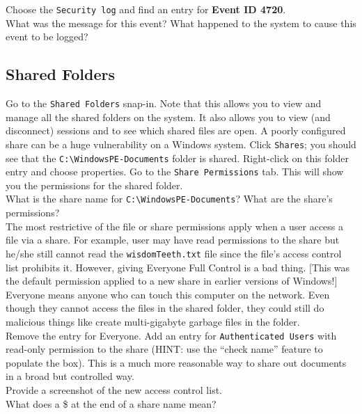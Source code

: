 \documentclass{article}
\begin{document}
\noindent Choose the {\tt Security log} and find an entry for \textbf{Event ID 4720}. \\

\question What was the message for this event? What happened to the system to cause this event to be logged?

\subsection{Shared Folders}
Go to the {\tt Shared Folders} snap-in. Note that this allows you to view and manage all the shared folders on the system. It also allows you to view (and disconnect) sessions and to see which shared files are open. A poorly configured share can be a huge vulnerability on a Windows system.
Click {\tt Shares}; you should see that the {\tt C:\textbackslash WindowsPE-Documents} folder is shared. Right-click on this folder entry and choose properties. Go to the {\tt Share Permissions} tab. This will show you the permissions for the shared folder.\\

\question What is the share name for {\tt C:\textbackslash WindowsPE-Documents}? What are the share's permissions?  \\

The most restrictive of the file or share permissions apply when a user access a file via a share. For example, user may have read permissions to the share but he/she still cannot read the {\tt wisdomTeeth.txt} file since the file's access control list prohibits it. However, giving Everyone Full Control is a bad thing. [This was the default permission applied to a new share in earlier versions of Windows!] Everyone means anyone who can touch this computer on the network. Even though they cannot access the files in the shared folder, they could still do malicious things like create multi-gigabyte garbage files in the folder.\\

Remove the entry for Everyone.  Add an entry for {\tt Authenticated Users}  with read-only permission to the share (HINT: use the ``check name'' feature to populate the box). This is a much more reasonable way to share out documents in a broad but controlled way.\\

\question Provide a screenshot of the new access control list. \\

\question What does a \$ at the end of a share name mean?	
\end{document}
